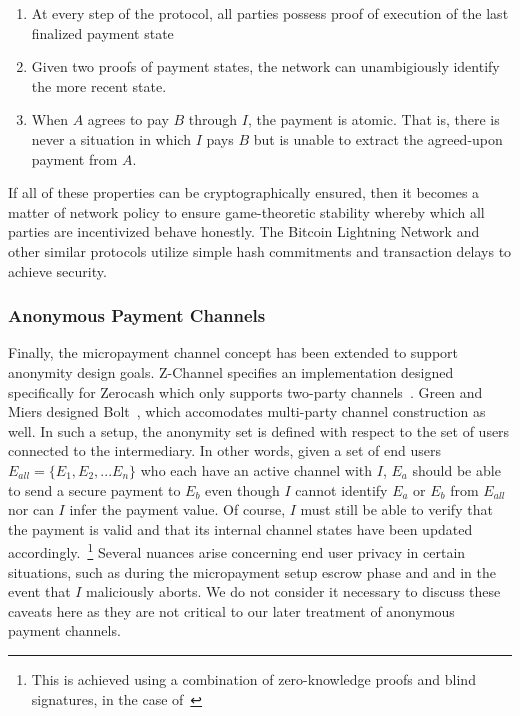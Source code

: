 \begin{enumerate}
\item At every step of the protocol, all parties possess proof of execution of
  the last finalized payment state
\item Given two proofs of payment states, the network can unambigiously identify
  the more recent state.
\item When $A$ agrees to pay $B$ through $I$, the payment is atomic. That is,
  there is never a situation in which $I$ pays $B$ but is unable to extract the
  agreed-upon payment from $A$.
\end{enumerate}

If all of these properties can be cryptographically ensured, then it becomes a
matter of network policy to ensure game-theoretic stability whereby which all
parties are incentivized behave honestly. The Bitcoin Lightning Network and
other similar protocols utilize simple hash commitments and transaction delays
to achieve security.

\subsubsection{Anonymous Payment Channels}

Finally, the micropayment channel concept has been extended to support anonymity
design goals. Z-Channel specifies an implementation designed specifically for
Zerocash which only supports two-party channels~\cite{zhang2017z}. Green and
Miers designed Bolt~\cite{green2017bolt}, which accomodates multi-party channel construction as
well. In such a setup, the anonymity set is defined with
respect to the set of users connected to the intermediary. In other words, given
a set of end users $E_{all} = \{E_1, E_2, ... E_n\}$ who each have an active
channel with $I$, $E_a$ should be able to send a secure payment to $E_b$ even
though $I$ cannot identify $E_a$ or $E_b$ from $E_{all}$ nor can $I$ infer the
payment value. Of course, $I$ must still be able to verify that the payment is
valid and that its internal channel states have been updated
accordingly.~\footnote{This is achieved using a combination of zero-knowledge
  proofs and blind signatures, in the case of~\cite{green2017bolt}} Several
nuances arise concerning end user privacy in certain situations, such as during
the micropayment setup escrow phase and and in the event that $I$ maliciously
aborts. We do not consider it necessary to discuss these caveats here as they
are not critical to our later treatment of anonymous payment channels.

